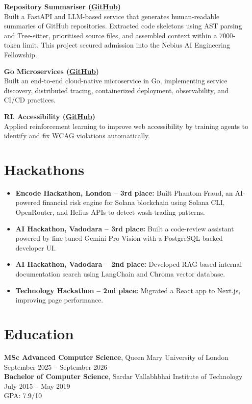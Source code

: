 \documentclass[a4paper,10pt]{article}
\newcommand{\project}[2]{
  \textbf{\color{accent}#1}\\
  {\small #2}
}
\begin{document}
\vspace{2pt}
\project{Repository Summariser \small{(\href{https://github.com/aymanapatel/nebius-project}{GitHub})}}{Built a FastAPI and LLM-based service that generates human-readable summaries of GitHub repositories. Extracted code skeletons using AST parsing and Tree-sitter, prioritised source files, and assembled context within a 7000-token limit. This project secured admission into the Nebius AI Engineering Fellowship.}

\vspace{2pt}
\project{Go Microservices \small{(\href{https://github.com/aymanapatel/golang-microservices}{GitHub})}}{Built an end-to-end cloud-native microservice in Go, implementing service discovery, distributed tracing, containerized deployment, observability, and CI/CD practices.}

\vspace{2pt}
\project{RL Accessibility \small{(\href{https://github.com/aymanapatel/rl-a11y}{GitHub})}}{Applied reinforcement learning to improve web accessibility by training agents to identify and fix WCAG violations automatically.}

\section{Hackathons}
\begin{itemize}
  \item \textbf{Encode Hackathon, London -- 3rd place:} Built Phantom Fraud, an AI-powered financial risk engine for Solana blockchain using Solana CLI, OpenRouter, and Helius APIs to detect wash-trading patterns.
  \item \textbf{AI Hackathon, Vadodara -- 3rd place:} Built a code-review assistant powered by fine-tuned Gemini Pro Vision with a PostgreSQL-backed developer UI.
  \item \textbf{AI Hackathon, Vadodara -- 2nd place:} Developed RAG-based internal documentation search using LangChain and Chroma vector database.
  \item \textbf{Technology Hackathon -- 2nd place:} Migrated a React app to Next.js, improving page performance.
\end{itemize}

\section{Education}
\textbf{MSc Advanced Computer Science}, Queen Mary University of London \hfill {\small September 2025 -- September 2026}\\
\textbf{Bachelor of Computer Science}, Sardar Vallabhbhai Institute of Technology \hfill {\small July 2015 -- May 2019}\\
{\small GPA: 7.9/10}
\end{document}
